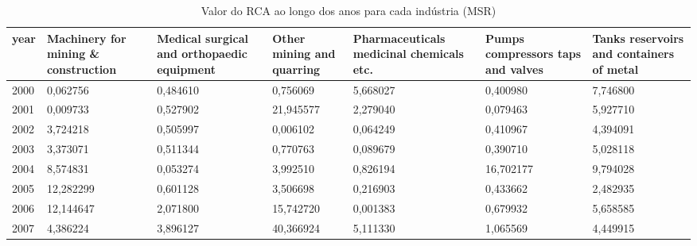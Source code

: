 \begin{table}
\centering
\caption{Valor do RCA ao longo dos anos para cada indústria (MSR)}
\begin{tabular}{p{1cm}p{2cm}p{2cm}p{2cm}p{2cm}p{2cm}p{2cm}}
\toprule
 year &  Machinery for mining \& construction &  Medical surgical and orthopaedic equipment &  Other mining and quarring &  Pharmaceuticals medicinal chemicals etc. &  Pumps compressors taps and valves &  Tanks reservoirs and containers of metal \\
\midrule
 2000 &                             0,062756 &                                    0,484610 &                   0,756069 &                                  5,668027 &                           0,400980 &                                  7,746800 \\
 2001 &                             0,009733 &                                    0,527902 &                  21,945577 &                                  2,279040 &                           0,079463 &                                  5,927710 \\
 2002 &                             3,724218 &                                    0,505997 &                   0,006102 &                                  0,064249 &                           0,410967 &                                  4,394091 \\
 2003 &                             3,373071 &                                    0,511344 &                   0,770763 &                                  0,089679 &                           0,390710 &                                  5,028118 \\
 2004 &                             8,574831 &                                    0,053274 &                   3,992510 &                                  0,826194 &                          16,702177 &                                  9,794028 \\
 2005 &                            12,282299 &                                    0,601128 &                   3,506698 &                                  0,216903 &                           0,433662 &                                  2,482935 \\
 2006 &                            12,144647 &                                    2,071800 &                  15,742720 &                                  0,001383 &                           0,679932 &                                  5,658585 \\
 2007 &                             4,386224 &                                    3,896127 &                  40,366924 &                                  5,111330 &                           1,065569 &                                  4,449915 \\

\end{tabular}
\end{table}
